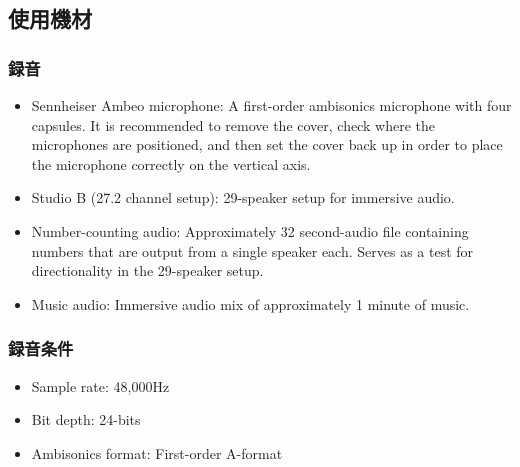 \documentclass[a4paper, 12pt]{article}
\begin{document}
\subsection{使用機材}

\subsubsection{録音}

\begin{itemize}
    \item Sennheiser Ambeo microphone: A first-order ambisonics microphone with four capsules. It is recommended to remove the cover, check where the microphones are positioned, and then set the cover back up in order to place the microphone correctly on the vertical axis.
    \item Studio B (27.2 channel setup): 29-speaker setup for immersive audio.
    \item Number-counting audio: Approximately 32 second-audio file containing numbers that are output from a single speaker each. Serves as a test for directionality in the 29-speaker setup.
    \item Music audio: Immersive audio mix of approximately 1 minute of music. 
\end{itemize}

\subsubsection{録音条件}
\begin{itemize}
    \item Sample rate: 48,000Hz
    \item Bit depth: 24-bits
    \item Ambisonics format: First-order A-format
\end{itemize}
\end{document}
